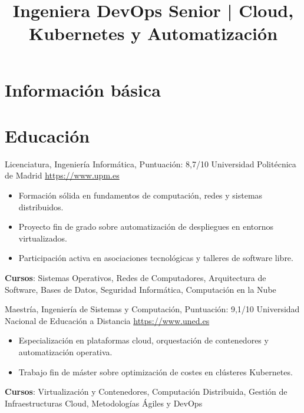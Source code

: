 \documentclass[a4paper, serif, 10pt]{moderncv}
\title{Ingeniera DevOps Senior | Cloud, Kubernetes y Automatización}
\begin{document}
\maketitle

\section{Información básica}

\section{Educación}

        {Licenciatura, Ingeniería Informática, Puntuación: 8,7/10}
        {Universidad Politécnica de Madrid}
        {\url{https://www.upm.es}}
        {}
        {\begin{itemize}
\item Formación sólida en fundamentos de computación, redes y sistemas distribuidos.
\item Proyecto fin de grado sobre automatización de despliegues en entornos virtualizados.
\item Participación activa en asociaciones tecnológicas y talleres de software libre.
\end{itemize}
\textbf{Cursos}: Sistemas Operativos, Redes de Computadores, Arquitectura de Software, Bases de Datos, Seguridad Informática, Computación en la Nube}

        {Maestría, Ingeniería de Sistemas y Computación, Puntuación: 9,1/10}
        {Universidad Nacional de Educación a Distancia}
        {\url{https://www.uned.es}}
        {}
        {\begin{itemize}
\item Especialización en plataformas cloud, orquestación de contenedores y automatización operativa.
\item Trabajo fin de máster sobre optimización de costes en clústeres Kubernetes.
\end{itemize}
\textbf{Cursos}: Virtualización y Contenedores, Computación Distribuida, Gestión de Infraestructuras Cloud, Metodologías Ágiles y DevOps}
\end{document}
